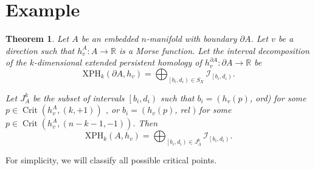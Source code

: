\documentclass[a4paper]{article}
\theoremstyle{theorem}
\newtheorem{theorem}{Theorem}[section]
\theoremstyle{definition}
\theoremstyle{remark}
\theoremstyle{gremark}
\theoremstyle{discussion}
\theoremstyle{notation}
\begin{document}
	
	
	
\section*{Example}

\begin{theorem}
	Let $A$ be an embedded $n$-manifold with boundary $\partial A$. Let $v$ be a direction such that $h_v^{A}: A \rightarrow \mathbb{R}$ is a Morse function. Let the interval	decomposition of the $k$-dimensional extended persistent homology of $h_v^{\partial A}: \partial A \rightarrow \mathbb{R}$ be
	$$
	\mathrm{XPH}_k\left(\partial A, h_v\right)=\bigoplus_{\left[b_i, d_i\right) \in S_X} \mathcal{I}_{\left[b_i, d_i\right)} .
	$$
	
	Let $J_A^k$ be the subset of intervals $\left[b_i, d_i\right)$ such that $b_i=\left(h_v(p)\right.$, ord) for some $p \in \operatorname{Crit}\left(h_v^A,(k,+1)\right)$ , or $b_i=\left(h_v(p)\right.$, rel $)$ for some $p \in \operatorname{Crit}\left(h_v^A,(n-k-1,-1)\right)$. Then
	$$
	\mathrm{XPH}_k\left(A, h_v\right)=\bigoplus_{\left[b_i, d_i\right) \in J_A^k} \mathcal{I}_{\left[b_i, d_i\right)} .
	$$
\end{theorem}

For simplicity, we will classify all possible critical points.
\end{document}
